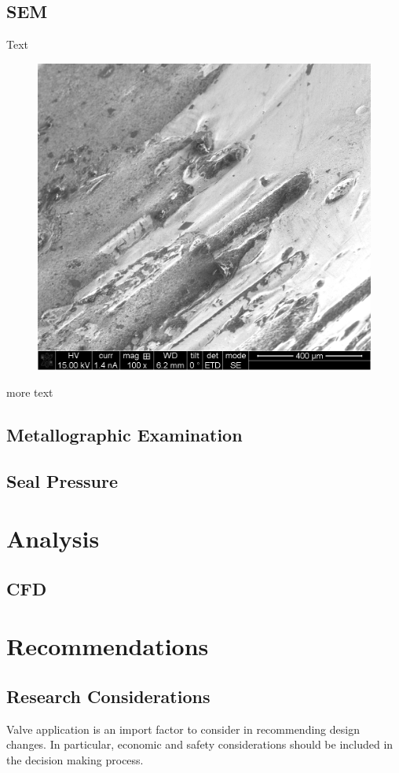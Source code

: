 \documentclass[]{article}
\begin{document}
\subsection{SEM}
Text

\begin{figure}[htbp]
	\centering
	\includegraphics[width=0.8\linewidth]{Photos/SEM_01.png}
\end{figure}

more text
\subsection{Metallographic Examination}
\subsection{Seal Pressure}


\section{Analysis}
\subsection{CFD}

\section{Recommendations}
\subsection{Research Considerations}
Valve application is an import factor to consider in recommending design changes. In particular, economic and safety considerations should be included in the decision making process.
\end{document}
